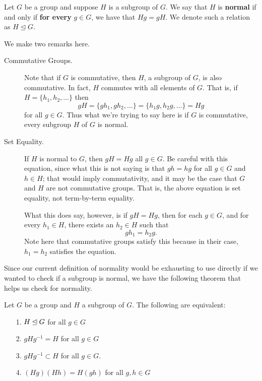     \begin{definition}
        Let $G$ be a group and suppose $H$ is a subgroup of $G$. We
        say that $H$ is \textbf{normal} if and only if \textbf{for every} $g
        \in G$, we have that $Hg = gH$. We denote such a relation as
        $H \unlhd G$.
    \end{definition}
    \noindent We make two remarks here.
    \begin{description}
        \item[Commutative Groups.] 
         
        Note that if $G$ is commutative, then $H$, a subgroup of $G$, is
        also commutative. In fact, $H$ commutes with all elements of $G$.
        That is, if $H = \{h_1, h_2, \dots \}$ then
        \[
            gH = \{gh_1, gh_2, \dots\} = \{h_1g, h_2g, \dots\} = Hg
        \]
        for all $g \in G$. Thus what we're trying to say here is if $G$ is commutative, every
        subgroup $H$ of $G$ is normal.

        \item[Set Equality.] If $H$ is normal to $G$, then $gH = Hg$
    all $g \in G$. Be careful with this equation, since what this is
    not saying is that $gh=hg$ for all $g\in G$ and $h \in H$; that
    would imply commutativity, and it may be the case that $G$ and $H$
    are not commutative groups. That is, the above equation is set
    equality, not term-by-term equality.

    What this does say, however, is if $gH = Hg$, then for each $g\in
    G$, and for every $h_1 \in H$, there exists an $h_2 \in H$ such
    that 
    \[
        gh_1 = h_2g.
    \]
    Note here that commutative groups satisfy this because in their
    case, $h_1 = h_2$ satisfies the equation. 
    \end{description}

    Since our current definition of normality would be exhausting to
    use directly if we wanted to check if a subgroup is normal, we
    have the following theorem that helps us check for normality. 

    \begin{thm}
        Let $G$ be a group and $H$ a subgroup of $G$. The following
        are equivalent:
        \begin{itemize}
            \item[1.] $H \unlhd G$ for all $g \in G$
            \item[2.] $gHg^{-1} = H$ for all $g \in G$
            \item[3.] $gHg^{-1} \subset H$ for all $g\in G$.
            \item[4.] $(Hg)(Hh) = H(gh)$ for all $g, h \in G$
        \end{itemize}
    \end{thm}


